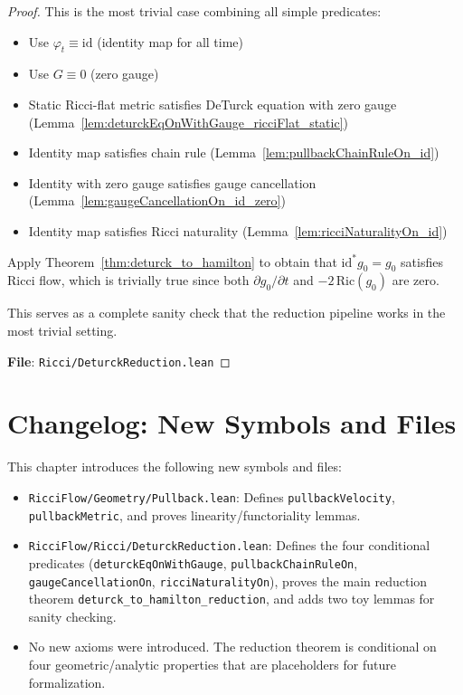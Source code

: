 \begin{proof}
\leanok
This is the most trivial case combining all simple predicates:
\begin{itemize}
\item Use $\varphi_t \equiv \mathrm{id}$ (identity map for all time)
\item Use $G \equiv 0$ (zero gauge)
\item Static Ricci-flat metric satisfies DeTurck equation with zero gauge (Lemma~\ref{lem:deturckEqOnWithGauge_ricciFlat_static})
\item Identity map satisfies chain rule (Lemma~\ref{lem:pullbackChainRuleOn_id})
\item Identity with zero gauge satisfies gauge cancellation (Lemma~\ref{lem:gaugeCancellationOn_id_zero})
\item Identity map satisfies Ricci naturality (Lemma~\ref{lem:ricciNaturalityOn_id})
\end{itemize}
Apply Theorem~\ref{thm:deturck_to_hamilton} to obtain that $\mathrm{id}^* g_0 = g_0$ satisfies Ricci flow, which is trivially true since both $\partial g_0/\partial t$ and $-2\,\mathrm{Ric}(g_0)$ are zero.

This serves as a complete sanity check that the reduction pipeline works in the most trivial setting.

\textbf{File}: \texttt{Ricci/DeturckReduction.lean}
\end{proof}

\section{Changelog: New Symbols and Files}

This chapter introduces the following new symbols and files:
\begin{itemize}
\item \texttt{RicciFlow/Geometry/Pullback.lean}: Defines \texttt{pullbackVelocity}, \texttt{pullbackMetric}, and proves linearity/functoriality lemmas.
\item \texttt{RicciFlow/Ricci/DeturckReduction.lean}: Defines the four conditional predicates (\texttt{deturckEqOnWithGauge}, \texttt{pullbackChainRuleOn}, \texttt{gaugeCancellationOn}, \texttt{ricciNaturalityOn}), proves the main reduction theorem \texttt{deturck\_to\_hamilton\_reduction}, and adds two toy lemmas for sanity checking.
\item No new axioms were introduced. The reduction theorem is conditional on four geometric/analytic properties that are placeholders for future formalization.
\end{itemize}

